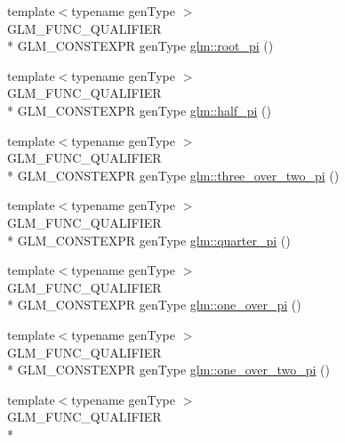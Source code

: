 \begin{DoxyCompactItemize}
\item 
{\footnotesize template$<$typename gen\-Type $>$ }\\G\-L\-M\-\_\-\-F\-U\-N\-C\-\_\-\-Q\-U\-A\-L\-I\-F\-I\-E\-R \\*
G\-L\-M\-\_\-\-C\-O\-N\-S\-T\-E\-X\-P\-R gen\-Type \hyperlink{group__gtc__constants_ga261380796b2cd496f68d2cf1d08b8eb9}{glm\-::root\-\_\-pi} ()
\item 
{\footnotesize template$<$typename gen\-Type $>$ }\\G\-L\-M\-\_\-\-F\-U\-N\-C\-\_\-\-Q\-U\-A\-L\-I\-F\-I\-E\-R \\*
G\-L\-M\-\_\-\-C\-O\-N\-S\-T\-E\-X\-P\-R gen\-Type \hyperlink{group__gtc__constants_ga0c36b41d462e45641faf7d7938948bac}{glm\-::half\-\_\-pi} ()
\item 
{\footnotesize template$<$typename gen\-Type $>$ }\\G\-L\-M\-\_\-\-F\-U\-N\-C\-\_\-\-Q\-U\-A\-L\-I\-F\-I\-E\-R \\*
G\-L\-M\-\_\-\-C\-O\-N\-S\-T\-E\-X\-P\-R gen\-Type \hyperlink{group__gtc__constants_gae94950df74b0ce382b1fc1d978ef7394}{glm\-::three\-\_\-over\-\_\-two\-\_\-pi} ()
\item 
{\footnotesize template$<$typename gen\-Type $>$ }\\G\-L\-M\-\_\-\-F\-U\-N\-C\-\_\-\-Q\-U\-A\-L\-I\-F\-I\-E\-R \\*
G\-L\-M\-\_\-\-C\-O\-N\-S\-T\-E\-X\-P\-R gen\-Type \hyperlink{group__gtc__constants_ga3c9df42bd73c519a995c43f0f99e77e0}{glm\-::quarter\-\_\-pi} ()
\item 
{\footnotesize template$<$typename gen\-Type $>$ }\\G\-L\-M\-\_\-\-F\-U\-N\-C\-\_\-\-Q\-U\-A\-L\-I\-F\-I\-E\-R \\*
G\-L\-M\-\_\-\-C\-O\-N\-S\-T\-E\-X\-P\-R gen\-Type \hyperlink{group__gtc__constants_ga555150da2b06d23c8738981d5013e0eb}{glm\-::one\-\_\-over\-\_\-pi} ()
\item 
{\footnotesize template$<$typename gen\-Type $>$ }\\G\-L\-M\-\_\-\-F\-U\-N\-C\-\_\-\-Q\-U\-A\-L\-I\-F\-I\-E\-R \\*
G\-L\-M\-\_\-\-C\-O\-N\-S\-T\-E\-X\-P\-R gen\-Type \hyperlink{group__gtc__constants_ga7c922b427986cbb2e4c6ac69874eefbc}{glm\-::one\-\_\-over\-\_\-two\-\_\-pi} ()
\item 
{\footnotesize template$<$typename gen\-Type $>$ }\\G\-L\-M\-\_\-\-F\-U\-N\-C\-\_\-\-Q\-U\-A\-L\-I\-F\-I\-E\-R \\*

\end{DoxyCompactItemize}
